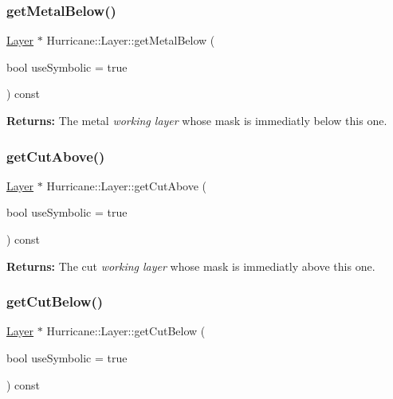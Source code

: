 \subsubsection{\texorpdfstring{get\+Metal\+Below()}{getMetalBelow()}}
{\footnotesize\ttfamily \hyperlink{classHurricane_1_1Layer}{Layer} $\ast$ Hurricane\+::\+Layer\+::get\+Metal\+Below (\begin{DoxyParamCaption}\item[{bool}]{use\+Symbolic = {\ttfamily true} }\end{DoxyParamCaption}) const}

{\bfseries Returns\+:} The metal {\itshape working layer} whose mask is immediatly below this one. \mbox{\label{classHurricane_1_1Layer_ad9fca94fed1837e3e80e9b6445822b7d}} 
\subsubsection{\texorpdfstring{get\+Cut\+Above()}{getCutAbove()}}
{\footnotesize\ttfamily \hyperlink{classHurricane_1_1Layer}{Layer} $\ast$ Hurricane\+::\+Layer\+::get\+Cut\+Above (\begin{DoxyParamCaption}\item[{bool}]{use\+Symbolic = {\ttfamily true} }\end{DoxyParamCaption}) const}

{\bfseries Returns\+:} The cut {\itshape working layer} whose mask is immediatly above this one. \mbox{\label{classHurricane_1_1Layer_a983956c8127688390f978cc5bd0d768d}} 
\subsubsection{\texorpdfstring{get\+Cut\+Below()}{getCutBelow()}}
{\footnotesize\ttfamily \hyperlink{classHurricane_1_1Layer}{Layer} $\ast$ Hurricane\+::\+Layer\+::get\+Cut\+Below (\begin{DoxyParamCaption}\item[{bool}]{use\+Symbolic = {\ttfamily true} }\end{DoxyParamCaption}) const}

